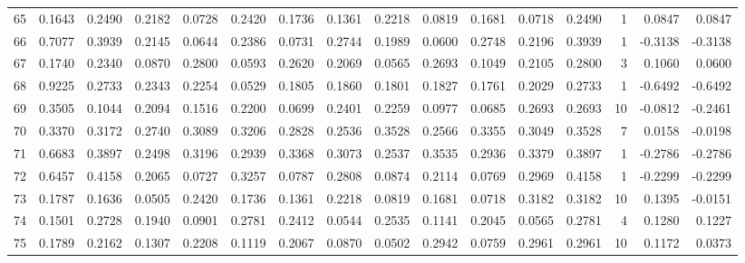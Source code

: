 \begin{tabular}{lrrrrrrrrrrrrrrr}
65  &      0.1643 &  0.2490 &  0.2182 &  0.0728 &  0.2420 &  0.1736 &  0.1361 &  0.2218 &  0.0819 &  0.1681 &   0.0718 &     0.2490 &      1 &                    0.0847 &                     0.0847 \\
66  &      0.7077 &  0.3939 &  0.2145 &  0.0644 &  0.2386 &  0.0731 &  0.2744 &  0.1989 &  0.0600 &  0.2748 &   0.2196 &     0.3939 &      1 &                   -0.3138 &                    -0.3138 \\
67  &      0.1740 &  0.2340 &  0.0870 &  0.2800 &  0.0593 &  0.2620 &  0.2069 &  0.0565 &  0.2693 &  0.1049 &   0.2105 &     0.2800 &      3 &                    0.1060 &                     0.0600 \\
68  &      0.9225 &  0.2733 &  0.2343 &  0.2254 &  0.0529 &  0.1805 &  0.1860 &  0.1801 &  0.1827 &  0.1761 &   0.2029 &     0.2733 &      1 &                   -0.6492 &                    -0.6492 \\
69  &      0.3505 &  0.1044 &  0.2094 &  0.1516 &  0.2200 &  0.0699 &  0.2401 &  0.2259 &  0.0977 &  0.0685 &   0.2693 &     0.2693 &     10 &                   -0.0812 &                    -0.2461 \\
70  &      0.3370 &  0.3172 &  0.2740 &  0.3089 &  0.3206 &  0.2828 &  0.2536 &  0.3528 &  0.2566 &  0.3355 &   0.3049 &     0.3528 &      7 &                    0.0158 &                    -0.0198 \\
71  &      0.6683 &  0.3897 &  0.2498 &  0.3196 &  0.2939 &  0.3368 &  0.3073 &  0.2537 &  0.3535 &  0.2936 &   0.3379 &     0.3897 &      1 &                   -0.2786 &                    -0.2786 \\
72  &      0.6457 &  0.4158 &  0.2065 &  0.0727 &  0.3257 &  0.0787 &  0.2808 &  0.0874 &  0.2114 &  0.0769 &   0.2969 &     0.4158 &      1 &                   -0.2299 &                    -0.2299 \\
73  &      0.1787 &  0.1636 &  0.0505 &  0.2420 &  0.1736 &  0.1361 &  0.2218 &  0.0819 &  0.1681 &  0.0718 &   0.3182 &     0.3182 &     10 &                    0.1395 &                    -0.0151 \\
74  &      0.1501 &  0.2728 &  0.1940 &  0.0901 &  0.2781 &  0.2412 &  0.0544 &  0.2535 &  0.1141 &  0.2045 &   0.0565 &     0.2781 &      4 &                    0.1280 &                     0.1227 \\
75  &      0.1789 &  0.2162 &  0.1307 &  0.2208 &  0.1119 &  0.2067 &  0.0870 &  0.0502 &  0.2942 &  0.0759 &   0.2961 &     0.2961 &     10 &                    0.1172 &                     0.0373 \\

\end{tabular}

